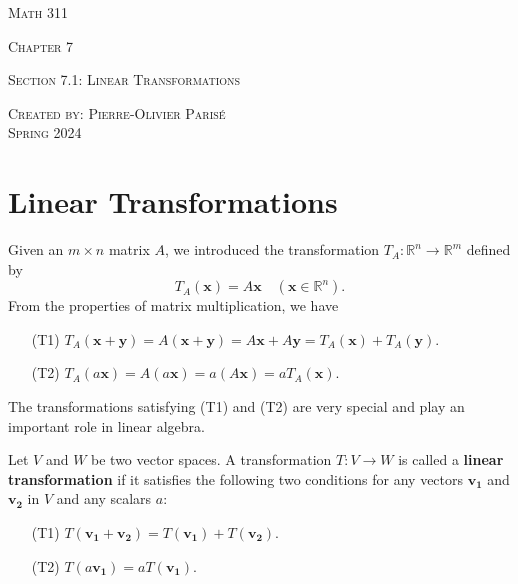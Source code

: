 \documentclass[20pt,a4paper]{extarticle}
\newcommand{\ra}{\rightarrow}
\newcounter{definition}
\begin{document}
\thispagestyle{empty}

\begin{center}
\vspace*{0.75cm}

{\Huge \textsc{Math 311}}

\vspace*{1.5cm}

{\LARGE \textsc{Chapter 7}} 

\vspace*{0.75cm}

\noindent\textsc{Section 7.1: Linear Transformations}

\vspace*{0.25cm}

\tableofcontents

\vfill

\noindent \textsc{Created by: Pierre-Olivier Paris{\'e}} \\
\textsc{Spring 2024}
\end{center}

\newpage

\section{Linear Transformations}

Given an $m \times n$ matrix $A$, we introduced the transformation $T_A : \mathbb{R}^n \ra \mathbb{R}^m$ defined by
	\[
		T_A (\mathbf{x}) = A \mathbf{x} \quad (\mathbf{x} \in \mathbb{R}^n ) .
	\]
From the properties of matrix multiplication, we have
	\begin{enumerate}
		\item[(T1)] $T_A (\mathbf{x} + \mathbf{y}) = A (\mathbf{x} + \mathbf{y}) = A \mathbf{x} + A\mathbf{y} = T_A (\mathbf{x}) + T_A (\mathbf{y})$.
		\item[(T2)] $T_A (a \mathbf{x}) = A (a \mathbf{x}) = a (A \mathbf{x}) = a T_A (\mathbf{x})$. 
	\end{enumerate}
The transformations satisfying (T1) and (T2) are very special and play an important role in linear algebra.


\begin{definition}
Let $V$ and $W$ be two vector spaces. A transformation $T : V \ra W$ is called a \textbf{linear transformation} if it satisfies the following two conditions for any vectors $\mathbf{v_1}$ and $\mathbf{v_2}$ in $V$ and any scalars $a$:
	\begin{enumerate}
		\item[(T1)] $T (\mathbf{v_1} + \mathbf{v_2}) = T (\mathbf{v_1}) + T (\mathbf{v_2})$.
		\item[(T2)] $T (a \mathbf{v_1}) = a T (\mathbf{v_1})$. 
	\end{enumerate}
\end{definition}
\end{document}

